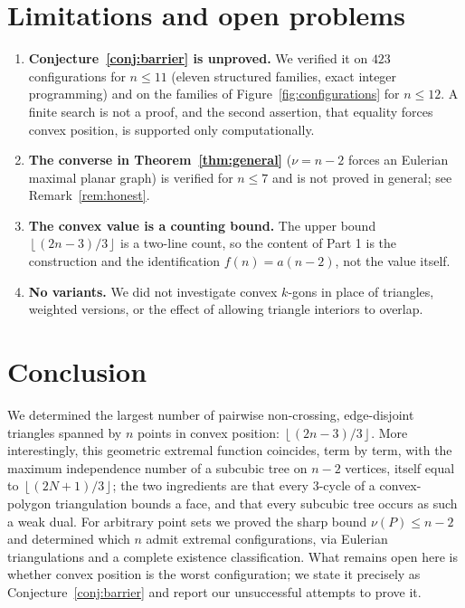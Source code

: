 \documentclass[11pt]{article}
\theoremstyle{plain}
\theoremstyle{definition}
\theoremstyle{remark}
\newcommand{\Floor}[1]{\left\lfloor #1\right\rfloor}
\begin{document}
\section{Limitations and open problems}

\begin{enumerate}
\item \textbf{Conjecture~\ref{conj:barrier} is unproved.}  We verified it on $423$
configurations for $n\le 11$ (eleven structured families, exact integer programming) and on
the families of Figure~\ref{fig:configurations} for $n\le 12$.  A finite search is not a
proof, and the second assertion, that equality forces convex position, is supported only
computationally.
\item \textbf{The converse in Theorem~\ref{thm:general}} ($\nu=n-2$ forces an Eulerian
maximal planar graph) is verified for $n\le 7$ and is not proved in general; see
Remark~\ref{rem:honest}.
\item \textbf{The convex value is a counting bound.}  The upper bound
$\Floor{(2n-3)/3}$ is a two-line count, so the content of Part 1 is the construction and
the identification $f(n)=a(n-2)$, not the value itself.
\item \textbf{No variants.}  We did not investigate convex $k$-gons in place of triangles,
weighted versions, or the effect of allowing triangle interiors to overlap.
\end{enumerate}

\section{Conclusion}

We determined the largest number of pairwise non-crossing, edge-disjoint triangles spanned
by $n$ points in convex position: $\Floor{(2n-3)/3}$.  More interestingly, this geometric
extremal function coincides, term by term, with the maximum independence number of a
subcubic tree on $n-2$ vertices, itself equal to $\Floor{(2N+1)/3}$; the two ingredients are
that every $3$-cycle of a convex-polygon triangulation bounds a face, and that every
subcubic tree occurs as such a weak dual.  For arbitrary point sets we proved the sharp
bound $\nu(P)\le n-2$ and determined which $n$ admit extremal configurations, via Eulerian
triangulations and a complete existence classification.  What remains open here is whether
convex position is the worst configuration; we state it precisely as
Conjecture~\ref{conj:barrier} and report our unsuccessful attempts to prove it.
\end{document}
